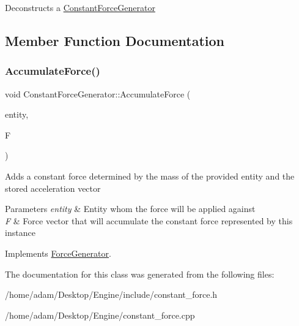 Deconstructs a \hyperlink{classConstantForceGenerator}{Constant\+Force\+Generator} 

\subsection{Member Function Documentation}
\mbox{\label{classConstantForceGenerator_a6a50c67567de9d26073a373aed77d29f}} 
\subsubsection{\texorpdfstring{Accumulate\+Force()}{AccumulateForce()}}
{\footnotesize\ttfamily void Constant\+Force\+Generator\+::\+Accumulate\+Force (\begin{DoxyParamCaption}\item[{std\+::shared\+\_\+ptr$<$ \hyperlink{classPhysicsEntity}{Physics\+Entity} $>$}]{entity,  }\item[{Vector3\+Gf \&}]{F }\end{DoxyParamCaption})\hspace{0.3cm}{\ttfamily [virtual]}}

Adds a constant force determined by the mass of the provided entity and the stored acceleration vector 
\begin{DoxyParams}{Parameters}
{\em entity} & Entity whom the force will be applied against \\
\hline
{\em F} & Force vector that will accumulate the constant force represented by this instance \\
\hline
\end{DoxyParams}


Implements \hyperlink{classForceGenerator}{Force\+Generator}.



The documentation for this class was generated from the following files\+:\begin{DoxyCompactItemize}
\item 
/home/adam/\+Desktop/\+Engine/include/constant\+\_\+force.\+h\item 
/home/adam/\+Desktop/\+Engine/constant\+\_\+force.\+cpp\end{DoxyCompactItemize}
